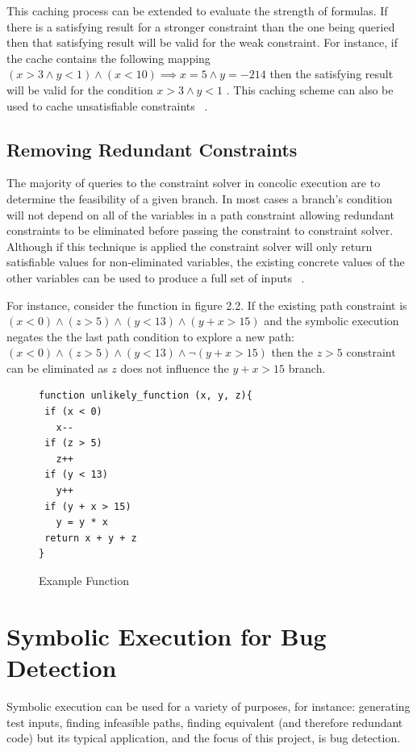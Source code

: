 \documentclass[]{final_report}
\begin{document}
This caching process can be extended to evaluate the strength of formulas. If there is a satisfying result for a stronger constraint than the one being queried then that satisfying result will be valid for the weak constraint. For instance, if the cache contains the following mapping $ (x > 3 \land y <1) \land (x < 10) \implies x = 5 \land y =  -214$ then the satisfying result will be valid for the condition $x > 3 \land y < 1 $ . This caching scheme can also be used to cache unsatisfiable constraints ~\cite{cadar2008klee}.

\subsection{Removing Redundant Constraints}

The majority of queries to the constraint solver in concolic execution are to determine the feasibility of a given branch. In most cases a branch's condition will not depend on all of the variables in a path constraint allowing redundant constraints to be eliminated before passing the constraint to constraint solver. Although if this technique is applied the constraint solver will only return satisfiable values for non-eliminated variables, the existing concrete values of the other variables can be used to produce a full set of inputs ~\cite{cadar2013symbolic}.

For instance, consider the function in figure 2.2. If the existing path constraint is  $(x < 0 ) \land ( z  > 5) \land (y < 13) \land (y + x > 15) $ and the symbolic execution negates the the last path condition to explore a new path:  $ (x < 0) \land (z > 5) \land (y < 13) \land \lnot(y + x > 15)$ then the  $z > 5$ constraint can be eliminated as $z$ does not influence the $y + x > 15$ branch.

\begin{figure}[h]
\begin{verbatim}
function unlikely_function (x, y, z){
 if (x < 0)
   x--
 if (z > 5)
   z++
 if (y < 13)
   y++
 if (y + x > 15)
   y = y * x
 return x + y + z
}
\end{verbatim}
\caption{\label{fig:abs-sum} Example Function}
\end{figure} 

\section{Symbolic Execution for Bug Detection}

Symbolic execution can be used for a variety of purposes, for instance: generating test inputs, finding infeasible paths,  finding equivalent (and therefore redundant code) but its typical application, and the focus of this project, is bug detection. 
\end{document}
